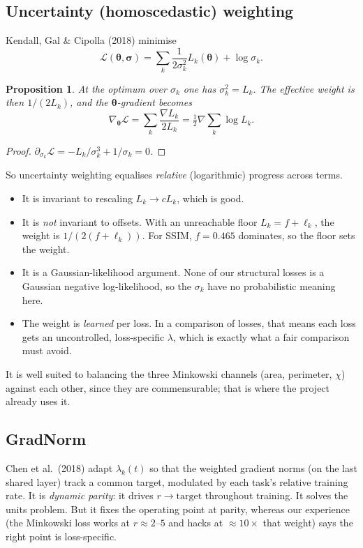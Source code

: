 \documentclass[11pt,a4paper]{article}
\newtheorem{proposition}{Proposition}
\theoremstyle{definition}
\theoremstyle{remark}
\newcommand{\btheta}{\bm{\theta}}
\begin{document}
\subsection{Uncertainty (homoscedastic) weighting}\label{sec:uw}
Kendall, Gal \& Cipolla (2018) minimise
\begin{equation}
  \mathcal L(\btheta,\bm\sigma)=\sum_k\frac{1}{2\sigma_k^2}L_k(\btheta)+\log\sigma_k.
\end{equation}
\begin{proposition}
At the optimum over $\sigma_k$ one has $\sigma_k^2=L_k$. The effective weight is then
$1/(2L_k)$, and the $\btheta$-gradient becomes
\begin{equation}
  \nabla_{\btheta}\mathcal L=\sum_k\frac{\nabla L_k}{2L_k}=\tfrac12\nabla\sum_k\log L_k.
\end{equation}
\end{proposition}
\begin{proof}
$\partial_{\sigma_k}\mathcal L=-L_k/\sigma_k^3+1/\sigma_k=0$.
\end{proof}
So uncertainty weighting equalises \emph{relative} (logarithmic) progress across terms.
\begin{itemize}[nosep]
\item It is invariant to rescaling $L_k\to cL_k$, which is good.
\item It is \emph{not} invariant to offsets. With an unreachable floor $L_k=f+\ell_k$, the
  weight is $1/(2(f+\ell_k))$. For SSIM, $f=0.465$ dominates, so the floor sets the weight.
\item It is a Gaussian-likelihood argument. None of our structural losses is a Gaussian
  negative log-likelihood, so the $\sigma_k$ have no probabilistic meaning here.
\item The weight is \emph{learned} per loss. In a comparison of losses, that means each
  loss gets an uncontrolled, loss-specific $\lambda$, which is exactly what a fair comparison
  must avoid.
\end{itemize}
It is well suited to balancing the three Minkowski channels (area, perimeter, $\chi$)
against each other, since they are commensurable; that is where the project already uses it.

\subsection{GradNorm}
Chen et al.\ (2018) adapt $\lambda_k(t)$ so that the weighted gradient norms (on the last
shared layer) track a common target, modulated by each task's relative training rate. It is
\emph{dynamic parity}: it drives $r\to\text{target}$ throughout training. It solves the
units problem. But it fixes the operating point at parity, whereas our experience (the
Minkowski loss works at $r\approx2$--$5$ and hacks at $\approx10\times$ that weight) says the
right point is loss-specific.
\end{document}
